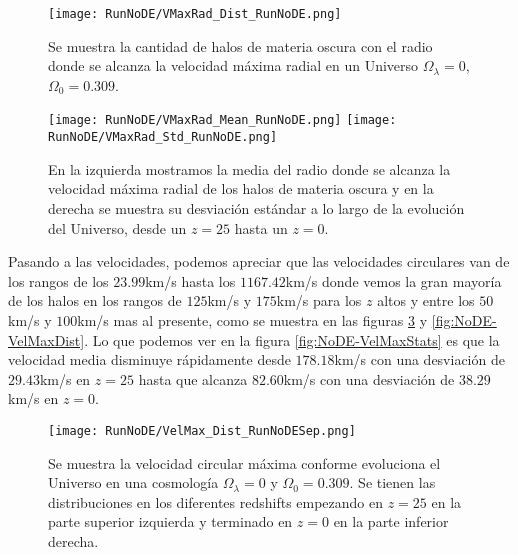 \begin{figure}[H]
    \centering
    \texttt{[image: RunNoDE/VMaxRad\_Dist\_RunNoDE.png]}
    \caption[Distribución del radio donde se alcanza la velocidad máxima radial de un Universo $\Omega_\lambda = 0$, $\Omega_0 = 0.309$]{\footnotesize Se muestra la cantidad de halos de materia oscura con el radio donde se alcanza la velocidad máxima radial en un Universo $\Omega_\lambda = 0$, $\Omega_0 = 0.309$.}
    \label{fig:NoDE-VMaxRadDist}
\end{figure}

\begin{figure}[H]
    \centering
    \texttt{[image: RunNoDE/VMaxRad\_Mean\_RunNoDE.png]}
    \texttt{[image: RunNoDE/VMaxRad\_Std\_RunNoDE.png]}
    \caption[Media y desviación estándar del Radio donde se alcanza la velocidad máxima radial de un Universo $\Omega_\lambda = 0$, $\Omega_0 = 0.309$]{\footnotesize En la izquierda mostramos la media del radio donde se alcanza la velocidad máxima radial de los halos de materia oscura y en la derecha se muestra su desviación estándar a lo largo de la evolución del Universo, desde un $z=25$ hasta un $z=0$.}
    \label{fig:NoDE-VMaxRadStats}
\end{figure}


Pasando a las velocidades, podemos apreciar que las velocidades circulares van de los rangos de los $23.99$km/s hasta los $1167.42$km/s donde vemos la gran mayoría de los halos en los rangos de $125$km/s y $175$km/s para los $z$ altos y entre los $50$km/s y $100$km/s mas al presente, como se muestra en las figuras \ref{fig:NoDE-VelMaxDistSep} y \ref{fig:NoDE-VelMaxDist}. Lo que podemos ver en la figura \ref{fig:NoDE-VelMaxStats} es que la velocidad media disminuye rápidamente desde $178.18$km/s con una desviación de $29.43$km/s en $z=25$ hasta que alcanza $82.60$km/s con una desviación de $38.29$km/s en $z=0$.

\begin{figure}[H]
    \centering
    \texttt{[image: RunNoDE/VelMax\_Dist\_RunNoDESep.png]}
    \caption[Velocidad circular máxima en la evolución de un Universo $\Omega_\lambda = 0$, $\Omega_0 = 0.309$]{\footnotesize Se muestra la velocidad circular máxima conforme evoluciona el Universo en una cosmología $\Omega_\lambda = 0$ y $\Omega_0 = 0.309$. Se tienen las distribuciones en los diferentes redshifts empezando en $z=25$ en la parte superior izquierda y terminado en $z=0$ en la parte inferior derecha.}
    \label{fig:NoDE-VelMaxDistSep}
\end{figure}

